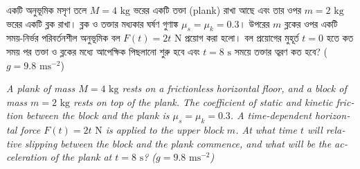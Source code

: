 \documentclass[12pt, a4paper]{article}
\begin{document}
\begin{tcolorbox}[questionbox={প্রশ্ন (Question) 39}]
    \noindent
    একটি অনুভূমিক মসৃণ তলে $M = 4\text{ kg}$ ভরের একটি তক্তা (plank) রাখা আছে এবং তার ওপর $m = 2\text{ kg}$ ভরের একটি ব্লক রাখা। ব্লক ও তক্তার মধ্যকার ঘর্ষণ গুণাঙ্ক $\mu_s = \mu_k = 0.3$। উপরের $m$ ব্লকের ওপর একটি সময়-নির্ভর পরিবর্তনশীল অনুভূমিক বল $F(t) = 2t\text{ N}$ প্রয়োগ করা হলো। বল প্রয়োগের মুহূর্ত $t = 0$ হতে কত সময় পর তক্তা ও ব্লকের মধ্যে আপেক্ষিক পিছলানো শুরু হবে এবং $t = 8\text{ s}$ সময়ে তক্তার ত্বরণ কত হবে? ($g = 9.8\text{ ms}^{-2}$)
    
    \vspace{0.8em}
    \begin{english}
    \noindent\textit{\color{darkgray}
    A plank of mass $M = 4\text{ kg}$ rests on a frictionless horizontal floor, and a block of mass $m = 2\text{ kg}$ rests on top of the plank. The coefficient of static and kinetic friction between the block and the plank is $\mu_s = \mu_k = 0.3$. A time-dependent horizontal force $F(t) = 2t\text{ N}$ is applied to the upper block $m$. At what time $t$ will relative slipping between the block and the plank commence, and what will be the acceleration of the plank at $t = 8\text{ s}$? ($g = 9.8\text{ ms}^{-2}$)
    }
    \end{english}
\end{tcolorbox}

\vspace{1em}
\begin{center}
\end{center}
\vspace{1em}
\end{document}
